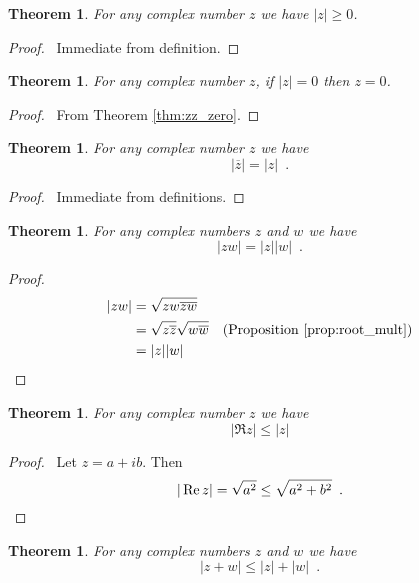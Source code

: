 \documentclass{book}
\let\qed\relax
\newtheorem{thm}[prop]{Theorem}
\theoremstyle{definition}
\begin{document}
\begin{thm}
For any complex number $z$ we have $|z| \geq 0$.
\end{thm}

\begin{proof}
\pf\ Immediate from definition. \qed
\end{proof}

\begin{thm}
For any complex number $z$, if $|z| = 0$ then $z = 0$.
\end{thm}

\begin{proof}
\pf\ From Theorem \ref{thm:zz_zero}. \qed
\end{proof}

\begin{thm}
For any complex number $z$ we have
\[ |\overline{z}| = |z| \enspace . \]
\end{thm}

\begin{proof}
\pf\ Immediate from definitions. \qed
\end{proof}

\begin{thm}
\label{thm:abs_mult}
For any complex numbers $z$ and $w$ we have
\[ |zw| = |z||w| \enspace . \]
\end{thm}

\begin{proof}
\pf
\begin{align*}
|zw| & = \sqrt{zw \overline{z} \overline{w}} \\
& = \sqrt{z \overline{z}} \sqrt{w \overline{w}} & (\text{Proposition \ref{prop:root_mult}}) \\
& = |z||w| & \qed
\end{align*}
\end{proof}

\begin{thm}
\label{thm:Re_leq_abs}
For any complex number $z$ we have
\[ |\Re z| \leq |z| \]
\end{thm}

\begin{proof}
\pf\ Let $z = a + ib$. Then
\[ |\Re z| = \sqrt{a^2} \leq \sqrt{a^2 + b^2} \enspace .  \qed \]
\end{proof}

\begin{thm}
For any complex numbers $z$ and $w$ we have
\[ |z+w| \leq |z| + |w| \enspace . \]
\end{thm}
\end{document}
